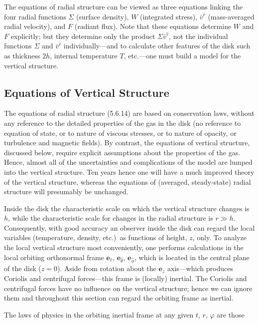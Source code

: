 The equations of radial structure can be viewed as three equations linking
the four radial functions $\Sigma$ (surface density), $W$ (integrated stress), $\bar{v}^{\hat{r}}$ (mass-averaged radial velocity), and $F$ (radiant flux).  Note that these equations
determine $W$ and $F$ explicitly; but they determine only the product $\Sigma\bar{v}^{\hat{r}}$, not
the individual functions $\Sigma$ and $\bar{v}^{\hat{r}}$ individually---and to
calculate other features of the disk such as thickness $2h$, internal temperature
$T$, etc.---one must build a model for the vertical structure.



\subsection{Equations of Vertical Structure}
\label{sec:5.7}

The equations of radial structure (5.6.14) are based on conservation laws,
without any reference to the detailed properties of the gas in the disk (no
reference to equation of state, or to nature of viscous stresses, or to nature
of opacity, or turbulence and magnetic fields).  By contrast, the
equations of vertical structure, discussed below, require explicit assumptions
about the properties of the gas.  Hence, almost all of the uncertainties and
complications of the model are lumped into the vertical structure.  Ten years
hence one will have a much improved theory of the vertical structure, whereas
the equations of (averaged, steady-state) radial structure will presumably be
unchanged.

Inside the disk the characteristic scale on which the vertical structure changes
is $h$, while the characteristic scale for changes in the radial structure is $r \gg h$.
Consequently, with good accuracy an observer inside the disk can regard the
local variables (temperature, density, etc.)\ as functions of height, $z$, only.  To
analyze the local vertical structure most conveniently, one performs calculations
in the local orbiting orthonormal frame $\mathbf{e}_{\hat{r}}$, $\mathbf{e}_{\hat{\theta}}$,
$\mathbf{e}_{\hat{\phi}}$, which is located in the
central plane of the disk ($z = 0$).  Aside from rotation about the $\mathbf{e}_z$ axis---which
produces Coriolis and centrifugal forces---this frame is (locally) inertial.  The
Coriolis and centrifugal forces have no influence on the vertical structure;
hence we can ignore them and throughout this section can regard the orbiting
frame as inertial.

The laws of physics in the orbiting inertial frame at any given $t$, $r$, $\varphi$ are those
